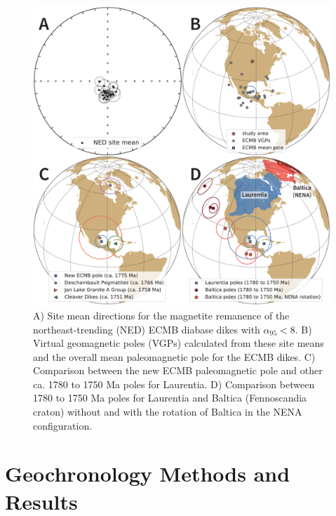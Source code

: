 \documentclass[draft]{agujournal2019}
\begin{document}
\begin{figure}[!ht]
\noindent\includegraphics[width=\textwidth]{./figures/paleomag_site_directions_pole.pdf}
\caption{\small{A) Site mean directions for the magnetite remanence of the northeast-trending (NED) ECMB diabase dikes with $\alpha_{95}<8$\textdegree. B) Virtual geomagnetic poles (VGPs) calculated from these site means and the overall mean paleomagnetic pole for the ECMB dikes. C) Comparison between the new ECMB paleomagnetic pole and other ca. 1780 to 1750 Ma poles for Laurentia. D) Comparison between 1780 to 1750 Ma poles for Laurentia and Baltica (Fennoscandia craton) without and with the rotation of Baltica in the NENA configuration.}}
\label{fig:site_means}
\end{figure}

\section*{Geochronology Methods and Results}
\end{document}
